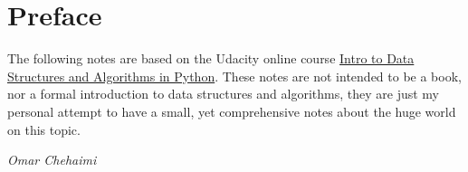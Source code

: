 \chapter*{Preface}

The following notes are based on the Udacity online course \href{https://www.udacity.com/course/data-structures-and-algorithms-in-python--ud513}{Intro to Data Structures and Algorithms in Python}. These notes are not intended to be a book, nor a formal introduction to data structures and algorithms, they are just my personal attempt to have a small, yet comprehensive notes about the huge world on this topic.
 
\begin{flushright}
	\textit{Omar Chehaimi}
\end{flushright}
